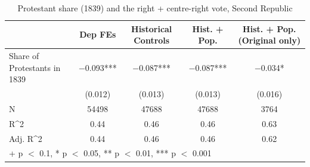 \begin{table}
\centering
\caption{Protestant share (1839) and the right + centre-right vote, Second Republic}
\centering
\begin{tabular}[t]{lcccc}
\toprule
  & Dep FEs & Historical Controls & Hist. + Pop. & Hist. + Pop. (Original only)\\
\midrule
Share of Protestants in 1839 & \num{-0.093}*** & \num{-0.087}*** & \num{-0.087}*** & \num{-0.034}*\\
 & (\num{0.012}) & (\num{0.013}) & (\num{0.013}) & (\num{0.016})\\
\midrule
N & \num{54498} & \num{47688} & \num{47688} & \num{3764}\\
R\textasciicircum{}2 & \num{0.44} & \num{0.46} & \num{0.46} & \num{0.63}\\
Adj. R\textasciicircum{}2 & \num{0.44} & \num{0.46} & \num{0.46} & \num{0.62}\\
\bottomrule
\multicolumn{5}{l}{\rule{0pt}{1em}+ p $<$ 0.1, * p $<$ 0.05, ** p $<$ 0.01, *** p $<$ 0.001}\\
\end{tabular}
\end{table}
